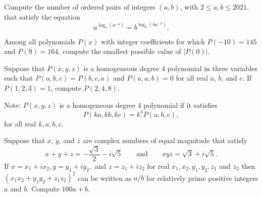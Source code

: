 \documentclass[11pt]{article}
\theoremstyle{definition}
\begin{document}
\begin{question}[name={2021 HMMT, Algebra \& Number Theory, \href{https://artofproblemsolving.com/community/c4p22157455}{Problem 2}}]
	Compute the number of ordered pairs of integers $(a, b)$, with $2 \le a, b \le 2021,$ that satisfy the equation
	\[a^{\log_b \left(a^{-4}\right)} = b^{\log_a \left(ba^{-3}\right)}.\]
\end{question}


%	




\begin{question}[name={2021 HMMT, Algebra \& Number Theory, \href{https://artofproblemsolving.com/community/c4p22157460}{Problem 3}}]
	Among all polynomials $P(x)$ with integer coefficients for which $P(-10) = 145$ and $P(9) = 164$, compute the smallest possible value of $|P(0)|$.
\end{question}


%	



\begin{question}[name={2021 HMMT, Algebra \& Number Theory, \href{https://artofproblemsolving.com/community/c4p22157468}{Problem 4}}]
	Suppose that $P(x, y, z)$ is a homogeneous degree 4 polynomial in three variables such that $P(a, b, c) = P(b, c, a)$ and $P(a, a, b) = 0$ for all real $a$, $b$, and $c$. If $P(1, 2, 3) = 1$, compute $P(2, 4, 8)$.
	
	Note: $P(x, y, z)$ is a homogeneous degree $4$ polynomial if it satisfies $$P(ka, kb, kc) = k^4P(a, b, c),$$ for all real $k, a, b, c$.
\end{question}


%	



\begin{question}[name={2021 HMMT, Algebra \& Number Theory, \href{https://artofproblemsolving.com/community/c4p22157488}{Problem 7}}]
	Suppose that $x$, $y$, and $z$ are complex numbers of equal magnitude that satisfy
	\[x+y+z = -\frac{\sqrt{3}}{2}-i\sqrt{5} \qquad \text{and} \qquad xyz=\sqrt{3} + i\sqrt{5}.\]If $x=x_1+ix_2, y=y_1+iy_2,$ and $z=z_1+iz_2$ for real $x_1,x_2,y_1,y_2,z_1$ and $z_2$ then
	$(x_1x_2+y_1y_2+z_1z_2)^2$ can be written as ${a}/{b}$ for relatively prime positive integers $a$ and $b$. Compute $100a+b.$
\end{question}
\end{document}
